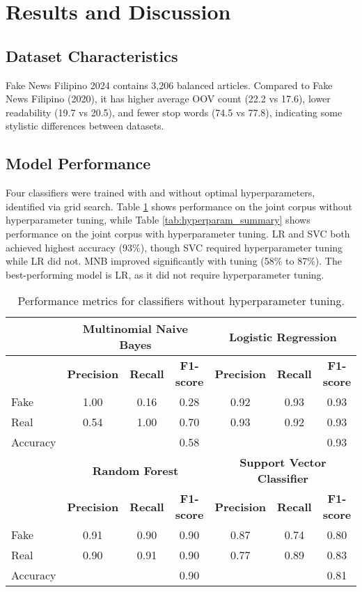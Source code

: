 \documentclass[conference]{IEEEtran}
\begin{document}
\section{Results and Discussion}

\subsection{Dataset Characteristics}
Fake News Filipino 2024 contains 3,206 balanced articles. Compared to Fake News Filipino (2020), it has higher average OOV count (22.2 vs 17.6), lower readability (19.7 vs 20.5), and fewer stop words (74.5 vs 77.8), indicating some stylistic differences between datasets.

\subsection{Model Performance}
Four classifiers were trained with and without optimal hyperparameters, identified via grid search. Table \ref{tab:no_hyperparam_summary} shows performance on the joint corpus without hyperparameter tuning, while Table \ref{tab:hyperparam_summary} shows performance on the joint corpus with hyperparameter tuning. LR and SVC both achieved highest accuracy (93\%), though SVC required hyperparameter tuning while LR did not. MNB improved significantly with tuning (58\% to 87\%). The best-performing model is LR, as it did not require hyperparameter tuning.

\begin{table}[!t]
\caption{Performance metrics for classifiers without hyperparameter tuning.}
\label{tab:no_hyperparam_summary}
\begin{center}
\begin{tabular}{|l|ccc|ccc|}
\hline
& \multicolumn{3}{c|}{\textbf{Multinomial Naive Bayes}} & \multicolumn{3}{c|}{\textbf{Logistic Regression}} \\
\hline
& \textbf{Precision} & \textbf{Recall} & \textbf{F1-score} & \textbf{Precision} & \textbf{Recall} & \textbf{F1-score} \\
\hline
Fake & 1.00 & 0.16 & 0.28 & 0.92 & 0.93 & 0.93 \\
Real & 0.54 & 1.00 & 0.70 & 0.93 & 0.92 & 0.93 \\
Accuracy & & & 0.58 & & & 0.93 \\
\hline
& \multicolumn{3}{c|}{\textbf{Random Forest}} & \multicolumn{3}{c|}{\textbf{Support Vector Classifier}} \\
\hline
& \textbf{Precision} & \textbf{Recall} & \textbf{F1-score} & \textbf{Precision} & \textbf{Recall} & \textbf{F1-score} \\
\hline
Fake & 0.91 & 0.90 & 0.90 & 0.87 & 0.74 & 0.80 \\
Real & 0.90 & 0.91 & 0.90 & 0.77 & 0.89 & 0.83 \\
Accuracy & & & 0.90 & & & 0.81 \\
\hline
\end{tabular}
\end{center}
\end{table}
\end{document}
